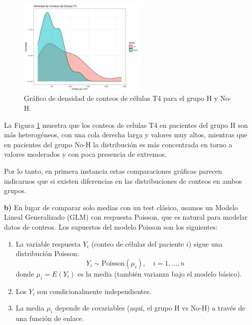 \begin{figure}[H]
    \centering
    \includegraphics[width=0.55\textwidth]{images/densidad_comparativa.png}
    \caption{Gráfico de densidad de conteos de células T4 para el grupo H y No-H.}
    \label{fig:3}
\end{figure}

La Figura \ref{fig:3} muestra que los conteos de celulas T4 en pacientes del grupo H son más heterogéneos, con una cola derecha larga y valores muy altos, mientras que en pacientes del grupo No-H la distribución es más concentrada en torno a valores moderados y con poca presencia de extremos.

\begin{tcolorbox}
Por lo tanto, en primera instancia estas comparaciones gráficas parecen indicarnos que si existen diferencias en las distribuciones de conteos en ambos grupos.
\end{tcolorbox}

\textbf{b)} En lugar de comparar solo medias con un test clásico, usamos un Modelo Lineal Generalizado (GLM) con respuesta Poisson, que es natural para modelar datos de conteos. Los supuestos del modelo Poisson son los siguientes:

\begin{enumerate}
    \item La variable respuesta $Y_i$ (conteo de células del paciente $i$) sigue una distribución Poisson:
    \begin{equation*}
        Y_i\sim\text{Poisson}(\mu_i), \quad i=1,\dotso,n 
    \end{equation*}
    donde $\mu_i = E(Y_i)$ es la media (también varianza bajo el modelo básico).
    \item Los $Y_i$ son condicionalmente independientes.
    \item La media $\mu_i$ depende de covariables (aquí, el grupo H vs No-H) a través de una función de enlace.
\end{enumerate}

